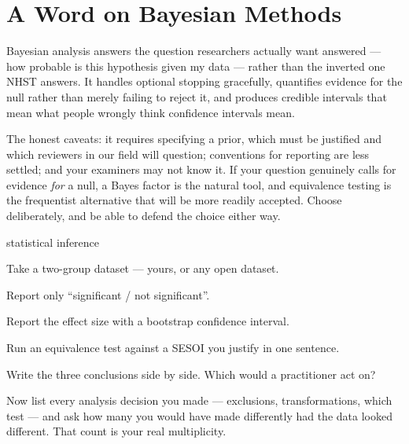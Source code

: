 \section{A Word on Bayesian Methods}

Bayesian analysis answers the question researchers actually want answered ---
how probable is this hypothesis given my data --- rather than the inverted one
NHST answers. It handles optional stopping gracefully, quantifies evidence for
the null rather than merely failing to reject it, and produces credible
intervals that mean what people wrongly think confidence intervals mean.

The honest caveats: it requires specifying a prior, which must be justified and
which reviewers in our field will question; conventions for reporting are less
settled; and your examiners may not know it. If your question genuinely calls
for evidence \emph{for} a null, a Bayes factor is the natural tool, and
equivalence testing is the frequentist alternative that will be more readily
accepted. Choose deliberately, and be able to defend the choice either way.

\begin{traditions}{statistical inference}
\end{traditions}

\begin{lab}
Take a two-group dataset --- yours, or any open dataset.

\begin{tightnum}
  \item Report only ``significant / not significant''.
  \item Report the effect size with a bootstrap confidence interval.
  \item Run an equivalence test against a SESOI you justify in one sentence.
  \item Write the three conclusions side by side. Which would a practitioner
    act on?
  \item Now list every analysis decision you made --- exclusions,
    transformations, which test --- and ask how many you would have made
    differently had the data looked different. That count is your real
    multiplicity.
\end{tightnum}
\end{lab}

